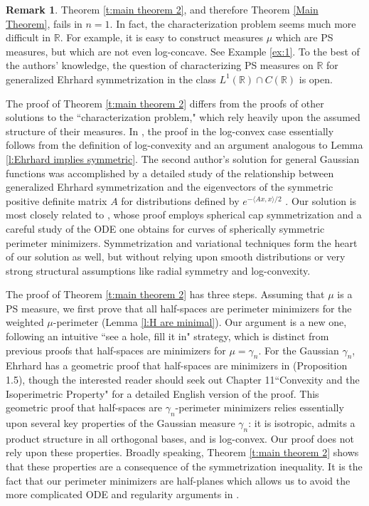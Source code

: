 \documentclass[12pt]{amsart}
\numberwithin{equation}{section}
\theoremstyle{plain}
\theoremstyle{definition}
\newtheorem{remark}[theorem]{Remark}
\begin{document}
\begin{remark}
Theorem \ref{t:main theorem 2}, and therefore Theorem \ref{Main Theorem}, fails in $n=1$.  In fact, the characterization problem seems much more difficult in $\mathbb{R}$.  For example, it is easy to construct measures $\mu$ which are PS measures, but which are not even log-concave.  See Example \ref{ex:1}. To the best of the authors' knowledge, the question of characterizing PS measures on $\mathbb{R}$ for generalized Ehrhard symmetrization in the class $L^1(\mathbb{R}) \cap C(\mathbb{R})$ is open.
\end{remark}

The proof of Theorem \ref{t:main theorem 2} differs from the proofs of other solutions to the ``characterization problem," which rely heavily upon the assumed structure of their measures.  In \cite{Bobkov96}, the proof in the log-convex case essentially follows from the definition of log-convexity and an argument analogous to Lemma \ref{l:Ehrhard implies symmetric}.  The second author's solution for general Gaussian functions was accomplished by a detailed study of the relationship between generalized Ehrhard symmetrization and the eigenvectors of the symmetric positive definite matrix $A$ for distributions defined by $e^{-\langle Ax, x\rangle /2}$ \cite{Yeh2023}.  Our solution is most closely related to \cite{Chambers19}, whose proof employs spherical cap symmetrization and a careful study of the ODE one obtains for curves of spherically symmetric perimeter minimizers.  Symmetrization and variational techniques form the heart of our solution as well, but without relying upon smooth distributions or very strong structural assumptions like radial symmetry and log-convexity.

The proof of Theorem \ref{t:main theorem 2} has three steps. Assuming that $\mu$ is a PS measure, we first prove that all half-spaces are perimeter minimizers for the weighted $\mu$-perimeter (Lemma \ref{l:H are minimal}).  Our argument is a new one, following an intuitive ``see a hole, fill it in" strategy, which is distinct from previous proofs that half-spaces are minimizers for $\mu = \gamma_n$.  For the Gaussian $\gamma_n$, Ehrhard has a geometric proof that half-spaces are minimizers in \cite{Ehrhard83} (Proposition 1.5), though the interested reader should seek out  \cite{lifshits1995gaussian} Chapter 11``Convexity and the Isoperimetric Property" for a detailed English version of the proof. This geometric proof that half-spaces are $\gamma_n$-perimeter minimizers relies essentially upon several key properties of the Gaussian measure $\gamma_n$: it is isotropic, admits a product structure in all orthogonal bases, and is log-convex. Our proof does not rely upon these properties.  Broadly speaking, Theorem \ref{t:main theorem 2} shows that these properties are a consequence of the symmetrization inequality.  It is the fact that our perimeter minimizers are half-planes which allows us to avoid the more complicated ODE and regularity arguments in \cite{Chambers19}.
\end{document}
